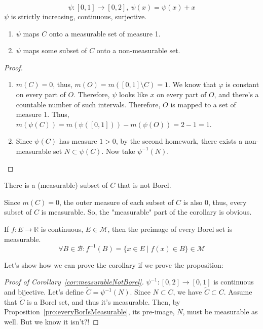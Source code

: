 \begin{definition}
    \[ \psi: [0,1] \to [0,2],\ \psi(x) = \psi(x) + x \]
    $\psi$ is strictly increasing, continuous, surjective.
\end{definition}
\begin{proposition}
    \begin{enumerate}
        \item {
            $\psi$ maps $C$ onto a measurable set of measure 1.
        }
        \item {
            $\psi$ maps some subset of $C$ onto a non-measurable set.
        }
    \end{enumerate}
\end{proposition}
\begin{proof}
    \begin{enumerate}
        \item {
            $m(C) = 0$, thus, $m(O) = m([0, 1] \setminus C) = 1$. We know that
            $\varphi$ is constant on every part of $O$.
            Therefore, $\psi$ looks like $x$ on every part of $O$,
            and there's a countable number of such intervals.
            Therefore, $O$ is mapped to a set of measure 1.
            Thus, $m(\psi(C)) = m(\psi([0, 1])) - m(\psi(O)) = 2 - 1 = 1$.
        }
        \item {
            Since $\psi(C)$ has measure $1 > 0$, by the second homework,
            there exists a non-measurable set $N \subset \psi(C)$. Now
            take $\psi^{-1}(N)$.
        }
    \end{enumerate}
\end{proof}
\begin{corollary}
    \label{cor:measurableNotBorel}
    There is a (measurable) subset of $C$ that is not Borel.
\end{corollary}
\begin{remark}
    Since $m(C) = 0$, the outer measure of each subset of $C$ is also 0,
    thus, every subset of $C$ is measurable. So, the "measurable" part of the 
    corollary is obvious.
\end{remark}
\begin{proposition}
    \label{pro:everyBorIsMeasurable}
    If $f : E \to \mathbb{R}$ is continuous, $E \in \mathcal{M}$, then
    the preimage of every Borel set is measurable.
    \[ \forall B \in \mathcal{B}: f^{-1}(B) = \{ x \in E \mid f(x) \in B \} \in \mathcal{M} \]
\end{proposition}
Let's show how we can prove the corollary if we prove the proposition:
\begin{proof}[Proof of Corollary~\ref{cor:measurableNotBorel}]
    $\psi^{-1}: [0, 2] \to [0, 1]$ is continuous and bijective.
    Let's define $\tilde{C} = \psi^{-1}(N)$. Since $N \subset C$, we have
    $\tilde{C} \subset C$.
    Assume that $\tilde{C}$ is a Borel set, and thus it's measurable.
    Then, by Proposition~\ref{pro:everyBorIsMeasurable},
    its pre-image, $N$, must be measurable as well. But we know it isn't?!
\end{proof}

